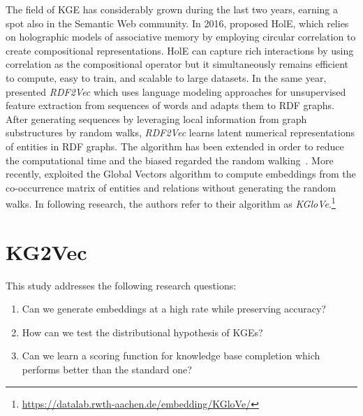 \documentclass[graybox]{archivesofdatascience}
\newcommand{\ktvplain}{KG2Vec\xspace}
\newcommand{\rtv}{\textit{RDF2Vec}\xspace}
\newcommand{\kgl}{\textit{KGloVe}\xspace}
\begin{document}
The field of KGE has considerably grown during the last two years, earning a spot also in the Semantic Web community. 
In 2016, \cite{nickel2016holographic} proposed HolE, which relies on holographic models of associative memory by employing circular correlation to create compositional representations. 
HolE can capture rich interactions by using correlation as the compositional operator but it simultaneously remains efficient to compute, easy to train, and scalable to large datasets. 
In the same year, \cite{ristoski2016rdf2vec} presented \rtv which uses language modeling approaches for unsupervised feature extraction from sequences of words and adapts them to RDF graphs. 
After generating sequences by leveraging local information from graph substructures by random walks, \rtv learns latent numerical representations of entities in RDF graphs.
The algorithm has been extended in order to reduce the computational time and the biased regarded the random walking~\citep{cochez2017biased}.
More recently, \cite{cochez2017global} exploited the Global Vectors algorithm to compute embeddings from the co-occurrence matrix of entities and relations without generating the random walks.
In following research, the authors refer to their algorithm as \kgl.\footnote{\url{https://datalab.rwth-aachen.de/embedding/KGloVe/}}







\section{\ktvplain} \label{sec:core}

This study addresses the following research questions:

\begin{enumerate}
    \item Can we generate embeddings at a high rate while preserving accuracy?
    \item How can we test the distributional hypothesis of KGEs?
    \item Can we learn a scoring function for knowledge base completion which performs better than the standard one?
\end{enumerate}
\end{document}
